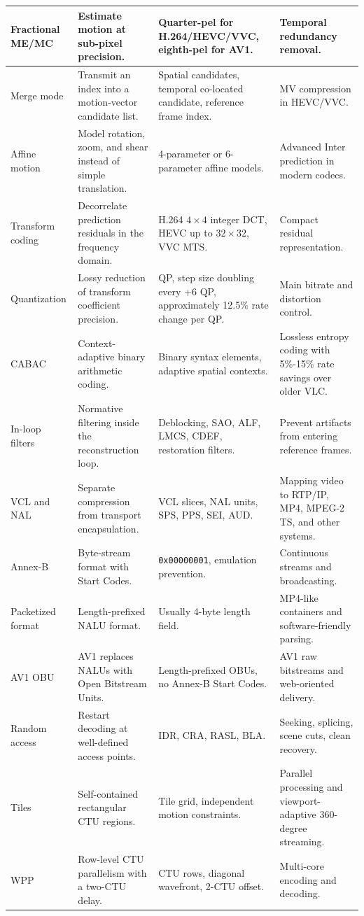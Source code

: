 \begin{center}
\begin{tabular}{|l|l|l|l|}
Fractional ME/MC & Estimate motion at sub-pixel precision. & Quarter-pel for H.264/HEVC/VVC, eighth-pel for AV1. & Temporal redundancy removal. \\ \hline
Merge mode & Transmit an index into a motion-vector candidate list. & Spatial candidates, temporal co-located candidate, reference frame index. & MV compression in HEVC/VVC. \\ \hline
Affine motion & Model rotation, zoom, and shear instead of simple translation. & 4-parameter or 6-parameter affine models. & Advanced Inter prediction in modern codecs. \\ \hline
Transform coding & Decorrelate prediction residuals in the frequency domain. & H.264 $4 \times 4$ integer DCT, HEVC up to $32 \times 32$, VVC MTS. & Compact residual representation. \\ \hline
Quantization & Lossy reduction of transform coefficient precision. & QP, step size doubling every +6 QP, approximately 12.5\% rate change per QP. & Main bitrate and distortion control. \\ \hline
CABAC & Context-adaptive binary arithmetic coding. & Binary syntax elements, adaptive spatial contexts. & Lossless entropy coding with 5\%-15\% rate savings over older VLC. \\ \hline
In-loop filters & Normative filtering inside the reconstruction loop. & Deblocking, SAO, ALF, LMCS, CDEF, restoration filters. & Prevent artifacts from entering reference frames. \\ \hline
VCL and NAL & Separate compression from transport encapsulation. & VCL slices, NAL units, SPS, PPS, SEI, AUD. & Mapping video to RTP/IP, MP4, MPEG-2 TS, and other systems. \\ \hline
Annex-B & Byte-stream format with Start Codes. & \texttt{0x00000001}, emulation prevention. & Continuous streams and broadcasting. \\ \hline
Packetized format & Length-prefixed NALU format. & Usually 4-byte length field. & MP4-like containers and software-friendly parsing. \\ \hline
AV1 OBU & AV1 replaces NALUs with Open Bitstream Units. & Length-prefixed OBUs, no Annex-B Start Codes. & AV1 raw bitstreams and web-oriented delivery. \\ \hline
Random access & Restart decoding at well-defined access points. & IDR, CRA, RASL, BLA. & Seeking, splicing, scene cuts, clean recovery. \\ \hline
Tiles & Self-contained rectangular CTU regions. & Tile grid, independent motion constraints. & Parallel processing and viewport-adaptive 360-degree streaming. \\ \hline
WPP & Row-level CTU parallelism with a two-CTU delay. & CTU rows, diagonal wavefront, 2-CTU offset. & Multi-core encoding and decoding. \\ \hline
\end{tabular}
\end{center}

